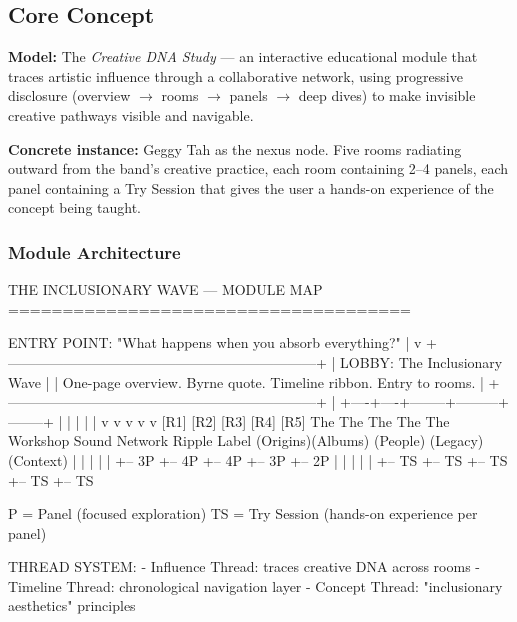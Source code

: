 \documentclass[11pt,letterpaper]{article}
\begin{document}
\subsection{Core Concept}

\begin{quotebox}
\textbf{Model:} The \textit{Creative DNA Study} --- an interactive educational module that traces artistic influence through a collaborative network, using progressive disclosure (overview $\rightarrow$ rooms $\rightarrow$ panels $\rightarrow$ deep dives) to make invisible creative pathways visible and navigable.

\textbf{Concrete instance:} Geggy Tah as the nexus node. Five rooms radiating outward from the band's creative practice, each room containing 2--4 panels, each panel containing a Try Session that gives the user a hands-on experience of the concept being taught.
\end{quotebox}

\subsubsection{Module Architecture}

\begin{asciibox}
  THE INCLUSIONARY WAVE --- MODULE MAP
  =====================================

  ENTRY POINT: "What happens when you absorb everything?"
        |
        v
  +------------------------------------------------------------------+
  | LOBBY: The Inclusionary Wave                                      |
  | One-page overview. Byrne quote. Timeline ribbon. Entry to rooms. |
  +------------------------------------------------------------------+
        |
   +----+----+--------+---------+--------+
   |         |        |         |        |
   v         v        v         v        v
  [R1]     [R2]     [R3]      [R4]     [R5]
  The      The      The       The      The
  Workshop Sound    Network   Ripple   Label
  (Origins)(Albums) (People)  (Legacy) (Context)
   |         |        |         |        |
   +-- 3P    +-- 4P   +-- 4P    +-- 3P   +-- 2P
   |         |        |         |        |
   +-- TS    +-- TS   +-- TS    +-- TS   +-- TS

  P = Panel (focused exploration)
  TS = Try Session (hands-on experience per panel)

  THREAD SYSTEM:
  - Influence Thread: traces creative DNA across rooms
  - Timeline Thread: chronological navigation layer
  - Concept Thread: "inclusionary aesthetics" principles
\end{asciibox}
\end{document}

